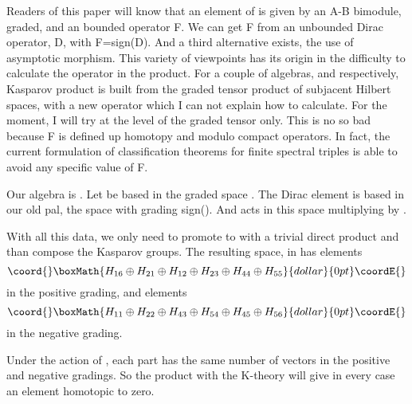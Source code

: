 \documentclass[a4paper,10pt]{article}
\begin{document}
Readers of this paper will know that an element of \coordHE{} is
given by an A-B \coordHE{} bimodule, graded, and an bounded operator
F.  We can get F from an unbounded Dirac operator,
D, with F=sign(D). And a third alternative exists, the use of
asymptotic morphism. This variety of viewpoints has its origin in
the difficulty to calculate the \coordHE{} operator in the product. For a 
couple of algebras, \coordHE{} and \coordHE{} respectively, Kasparov
product \coordHE{} is built from the graded tensor product of subjacent
Hilbert spaces, with a new operator \coordHE{} which I can not
explain how to calculate. 
For the moment, I will try at the level of the graded tensor only. This is no
so bad because F is defined up homotopy and modulo compact operators. In fact,
the current formulation of classification theorems for finite spectral
triples \cite{kr1,PS} is able
to avoid any specific value of F.

Our algebra is \coordHE{}. Let \coordHE{} be based in the graded space
\coordHE{}. The Dirac element 
\coordHE{} is based in our old pal\cite{previous}, the 
space \coordHE{} with grading \coordHE{}sign(\coordHE{})\coordHE{}.
And \coordHE{} acts in this space
multiplying by \coordHE{}.

With all this data, we only need to promote \coordHE{} to 
\coordHE{} with a trivial direct product and than compose
the Kasparov groups. The resulting space, in \coordHE{} has elements
$$\coord{}\boxMath{H_{16}\oplus H_{21}\oplus H_{12}\oplus H_{23}\oplus H_{44} \oplus H_{55}
}{dollar}{0pt}\coordE{}$$ in the positive grading, and elements
$$\coord{}\boxMath{H_{11}\oplus H_{22}\oplus H_{43}\oplus H_{54}\oplus H_{45} \oplus H_{56}
}{dollar}{0pt}\coordE{}$$ in the negative grading. 

Under the action of \coordHE{}, each part has the same number of vectors in the
positive and negative gradings. So the product with the K-theory will give
in every case an element homotopic to zero. 
\end{document}
